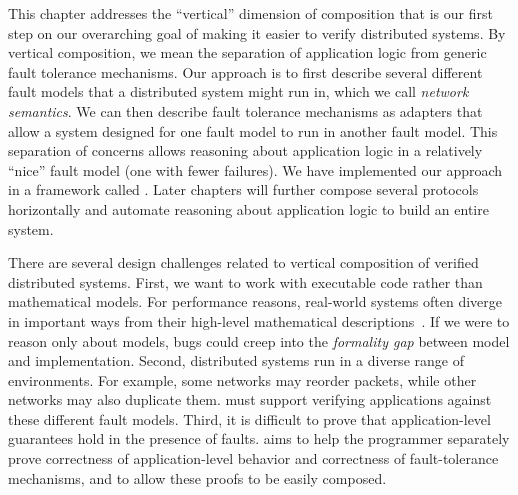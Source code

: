 
This chapter addresses the ``vertical'' dimension of composition
  that is our first step on our overarching goal of making it easier to verify distributed systems.
By vertical composition, we mean the separation of application logic
  from generic fault tolerance mechanisms.
Our approach is to first describe several different fault models
  that a distributed system might run in,
  which we call \emph{network semantics}.
We can then describe fault tolerance mechanisms as adapters
  that allow a system designed for one fault model to run in another fault model.
This separation of concerns allows reasoning about application logic
  in a relatively ``nice'' fault model (one with fewer failures).
We have implemented our approach in a framework called \Verdi.
Later chapters will further compose several protocols horizontally
  and automate reasoning about application logic
  to build an entire system.

There are several design challenges related to
  vertical composition of verified distributed systems.
First, we want to work with executable code rather than mathematical models.
%
For performance reasons, real-world systems often diverge
in important ways from their high-level mathematical descriptions~\cite{chandra:paxos-made-live}.
%
If we were to reason only about models,
  bugs could creep into the \emph{formality gap} between model and implementation.
%
Second, distributed systems run in a diverse range of environments. For
example, some networks may reorder packets, while other networks may also
duplicate them. \Verdi must support verifying applications against these
different fault models.
%
Third, it is difficult to prove that application-level guarantees hold in
the presence of faults. \Verdi aims to help the programmer separately prove
correctness of application-level behavior and correctness of
fault-tolerance mechanisms, and to allow these proofs to be easily composed.

